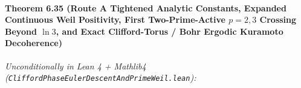 \documentclass[
  11pt,
]{article}
\begin{document}
\paragraph{\texorpdfstring{Theorem 6.35 (Route A Tightened Analytic
Constants, Expanded Continuous Weil Positivity, First Two-Prime-Active
\(p = 2, 3\) Crossing Beyond \(\ln 3\), and Exact Clifford-Torus / Bohr
Ergodic Kuramoto
Decoherence)}{Theorem 6.35 (Route A Tightened Analytic Constants, Expanded Continuous Weil Positivity, First Two-Prime-Active p = 2, 3 Crossing Beyond \textbackslash ln 3, and Exact Clifford-Torus / Bohr Ergodic Kuramoto Decoherence)}}\label{theorem-6.35-route-a-tightened-analytic-constants-expanded-continuous-weil-positivity-first-two-prime-active-p-2-3-crossing-beyond-ln-3-and-exact-clifford-torus-bohr-ergodic-kuramoto-decoherence}

\emph{Unconditionally in Lean 4 + Mathlib4
(\texttt{CliffordPhaseEulerDescentAndPrimeWeil.lean}):}
\end{document}
